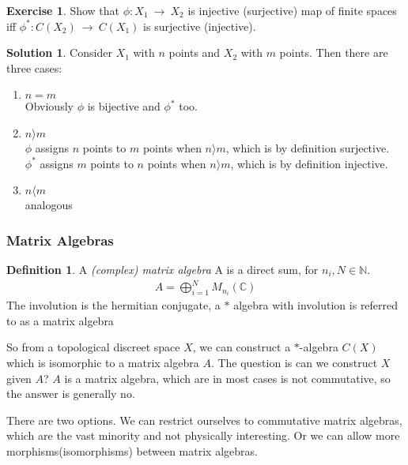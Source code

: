 \documentclass[a4paper]{article}
\theoremstyle{definition}
\newtheorem{definition}{Definition}
\theoremstyle{definition}
\theoremstyle{theorem}
\theoremstyle{theorem}
\newtheorem{exercise}{Exercise}
\theoremstyle{definition}
\newtheorem{solution}{Solution}
\begin{document}
\begin{exercise}
    Show that $\phi :X_1\ \rightarrow \ X_2$ is injective (surjective) map of finite spaces iff
    $\phi ^* :C(X_2)\ \rightarrow \ C(X_1)$ is surjective (injective).
\end{exercise}
\begin{solution}
    Consider $X_1$ with $n$ points and $X_2$ with $m$ points. Then there are three cases:
    \begin{enumerate}
        \item $n=m$ \\
            Obviously $\phi$ is bijective and $\phi ^*$ too.
        \item $n \rangle  m$ \\
            $\phi$ assigns $n$ points to $m$ points when $n \rangle  m$,
            which is by definition surjective. \\
            $\phi ^*$ assigns $m$ points to $n$ points when $n \rangle  m$,
            which is by definition injective. \\
        \item $n \langle  m $ \\
            analogous
    \end{enumerate}
\end{solution}

\subsubsection{Matrix Algebras}
\begin{definition}
    A \textit{(complex) matrix algebra} A is a direct sum, for $n_i, N \in \mathbb{N}$.
    \begin{align*}
        A = \bigoplus _{i=1}^{N} M_{n_i}(\mathbb{C})
    \end{align*}
    The involution is the hermitian conjugate, a $*$ algebra with involution is referred to as
    a matrix algebra
\end{definition}

So from a topological discreet space $X$, we can construct a $*$-algebra $C(X)$ which is isomorphic
to a matrix algebra $A$. The question is can we construct $X$ given $A$? $A$ is a matrix algebra,
which are in most cases is not commutative, so the answer is generally no.

There are two options. We can restrict ourselves to commutative matrix algebras,
which are the vast minority and not physically interesting.
Or we can allow more morphisms(isomorphisms) between matrix algebras.
\end{document}
